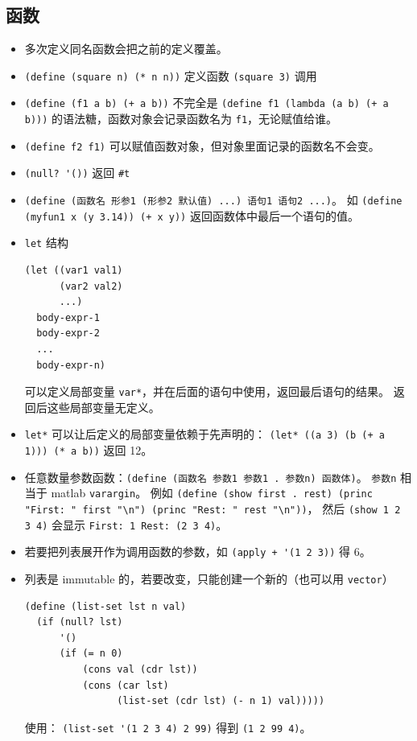 \subsection{函数}
\begin{itemize}
\item 多次定义同名函数会把之前的定义覆盖。
\item \verb`(define (square n) (* n n))` 定义函数 \verb`(square 3)` 调用
\item \verb`(define (f1 a b) (+ a b))` 不完全是 \verb`(define f1 (lambda (a b) (+ a b)))` 的语法糖，函数对象会记录函数名为 \verb`f1`，无论赋值给谁。
\item \verb`(define f2 f1)` 可以赋值函数对象，但对象里面记录的函数名不会变。
\item \verb`(null? '())` 返回 \verb`#t`
\item \verb`(define (函数名 形参1 (形参2 默认值) ...) 语句1 语句2 ...)`。 如 \verb`(define (myfun1 x (y 3.14)) (+ x y))` 返回函数体中最后一个语句的值。
\item \verb`let` 结构
\begin{lstlisting}[language=none]
(let ((var1 val1)
      (var2 val2)
      ...)
  body-expr-1
  body-expr-2
  ...
  body-expr-n)
\end{lstlisting}
可以定义局部变量 \verb`var*`，并在后面的语句中使用，返回最后语句的结果。 返回后这些局部变量无定义。
\item \verb`let*` 可以让后定义的局部变量依赖于先声明的： \verb`(let* ((a 3) (b (+ a 1))) (* a b))` 返回 12。
\item 任意数量参数函数：\verb`(define (函数名 参数1 参数1 . 参数n) 函数体)`。 \verb`参数n` 相当于 matlab \verb`varargin`。 例如 \verb`(define (show first . rest) (princ "First: " first "\n") (princ "Rest: " rest "\n"))`， 然后 \verb`(show 1 2 3 4)` 会显示 \verb`First: 1 Rest: (2 3 4)`。
\item 若要把列表展开作为调用函数的参数，如 \verb`(apply + '(1 2 3))` 得 6。
\item 列表是 immutable 的，若要改变，只能创建一个新的（也可以用 \verb`vector`）
\begin{lstlisting}[language=none]
(define (list-set lst n val)
  (if (null? lst)
      '()
      (if (= n 0)
          (cons val (cdr lst))
          (cons (car lst)
                (list-set (cdr lst) (- n 1) val)))))
\end{lstlisting}
使用： \verb`(list-set '(1 2 3 4) 2 99)` 得到 \verb`(1 2 99 4)`。
\end{itemize}

